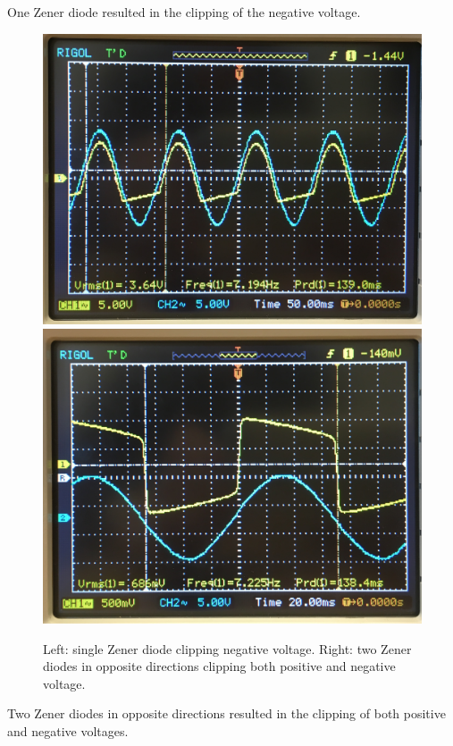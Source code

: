 \documentclass[twocolumn, amsmath]{revtex4}
\begin{document}
One Zener diode resulted in the clipping of the negative voltage.
\begin{figure}[h]
    \includegraphics[scale=0.041]{zener2}  
    \includegraphics[scale=0.041]{zener1}  
    \caption{Left: single Zener diode clipping negative voltage. Right: two Zener diodes in opposite directions clipping both positive and negative voltage.}
\end{figure}
Two Zener diodes in opposite directions resulted in the clipping of both positive and negative voltages.

\end{document}
